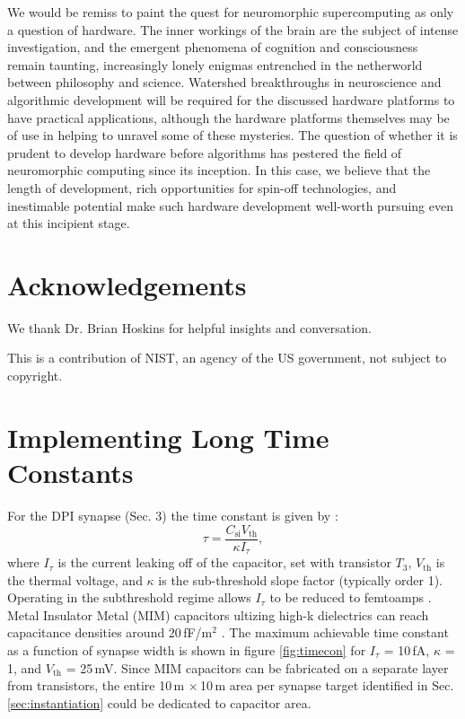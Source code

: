\documentclass[twocolumn]{article}
\begin{document}
We would be remiss to paint the quest for neuromorphic supercomputing as only a question of hardware. The inner workings of the brain are the subject of intense investigation, and the emergent phenomena of cognition and consciousness remain taunting, increasingly lonely enigmas entrenched in the netherworld between philosophy and science. Watershed breakthroughs in neuroscience and algorithmic development will be required for the discussed hardware platforms to have practical applications, although the hardware platforms themselves may be of use in helping to unravel some of these mysteries. The question of whether it is prudent to develop hardware before algorithms has pestered the field of neuromorphic computing since its inception. In this case, we believe that the length of development, rich opportunities for spin-off technologies, and inestimable potential make such hardware development well-worth pursuing even at this incipient stage.  

\section*{Acknowledgements}
We thank Dr. Brian Hoskins for helpful insights and conversation.

\vspace{1em}
\noindent This is a contribution of NIST, an agency of the US government, not subject to copyright.
\appendix

\section{Implementing Long Time Constants}\label{apx:TimeCon}
For the DPI synapse (Sec. 3) the time constant is given by \cite{chicca2014neuromorphic}:
\begin{equation}
    \tau = \frac{C_{\mathrm{si}}V_{\mathrm{th}}}{\kappa I_{\tau}},
\end{equation}
where $I_{\tau}$ is the current leaking off of the capacitor, set with transistor $T_3$, $V_{\mathrm{th}}$ is the thermal voltage, and $\kappa$ is the sub-threshold slope factor (typically order 1). Operating in the subthreshold regime allows $I_{\tau}$ to be reduced to femtoamps \cite{linares2003design}. Metal Insulator Metal (MIM) capacitors ultizing high-k dielectrics can reach capacitance densities around 20\,fF/\textmu m$^2$ \cite{wu2009metal}. The maximum achievable time constant as a function of synapse width is shown in figure \ref{fig:timecon} for $I_{\tau}$ = 10\,fA, $\kappa$ = 1, and $V_{\mathrm{th}}$ = 25\,mV. Since MIM capacitors can be fabricated on a separate layer from transistors, the entire 10\,\textmu m $\times$\,10\,\textmu m area per synapse target identified in Sec. \ref{sec:instantiation} could be dedicated to capacitor area.
\end{document}
